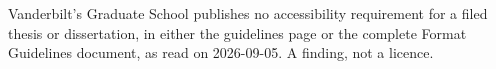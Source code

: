 

	{Vanderbilt's Graduate School publishes no accessibility requirement for a
	 filed thesis or dissertation, in either the guidelines page or the complete
	 Format Guidelines document, as read on 2026-09-05. A finding, not a
	 licence.}

